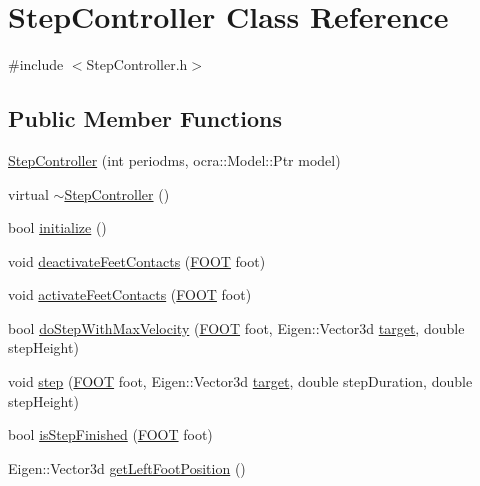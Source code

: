\hypertarget{classStepController}{\section{\-Step\-Controller \-Class \-Reference}
\label{classStepController}
}


{\ttfamily \#include $<$\-Step\-Controller.\-h$>$}

\subsection*{\-Public \-Member \-Functions}
\begin{DoxyCompactItemize}
\item 
\hyperlink{classStepController_a80b7436dcb5c1d4a3e04f805b8f8f32a}{\-Step\-Controller} (int periodms, ocra\-::\-Model\-::\-Ptr model)
\item 
virtual \hyperlink{classStepController_ae2033c937309c104539b6758346529d5}{$\sim$\-Step\-Controller} ()
\item 
bool \hyperlink{classStepController_a8f061f201c651d920ca02f7daa07adfe}{initialize} ()
\item 
void \hyperlink{classStepController_ada72856c76030cc22ebb18f368f829f1}{deactivate\-Feet\-Contacts} (\hyperlink{utils_8h_a4b6a8e135f90bd56e5a57a60efb42529}{\-F\-O\-O\-T} foot)
\item 
void \hyperlink{classStepController_a6184693a199603c945250a58ceb8d9a2}{activate\-Feet\-Contacts} (\hyperlink{utils_8h_a4b6a8e135f90bd56e5a57a60efb42529}{\-F\-O\-O\-T} foot)
\item 
bool \hyperlink{classStepController_a1bfcb66d504440f0cc7383ad688dad5c}{do\-Step\-With\-Max\-Velocity} (\hyperlink{utils_8h_a4b6a8e135f90bd56e5a57a60efb42529}{\-F\-O\-O\-T} foot, \-Eigen\-::\-Vector3d \hyperlink{classStepController_a588d5b149eb4a6877e89ecff37d0f91d}{target}, double step\-Height)
\item 
void \hyperlink{classStepController_ab8ca9c17211622c4902ce8adc89f9ca5}{step} (\hyperlink{utils_8h_a4b6a8e135f90bd56e5a57a60efb42529}{\-F\-O\-O\-T} foot, \-Eigen\-::\-Vector3d \hyperlink{classStepController_a588d5b149eb4a6877e89ecff37d0f91d}{target}, double step\-Duration, double step\-Height)
\item 
bool \hyperlink{classStepController_ac8e210ab8acf9c7b91bce3396fff20c8}{is\-Step\-Finished} (\hyperlink{utils_8h_a4b6a8e135f90bd56e5a57a60efb42529}{\-F\-O\-O\-T} foot)
\item 
\-Eigen\-::\-Vector3d \hyperlink{classStepController_aa168e028dc086859400e1c93c0becdd2}{get\-Left\-Foot\-Position} ()

\end{DoxyCompactItemize}
